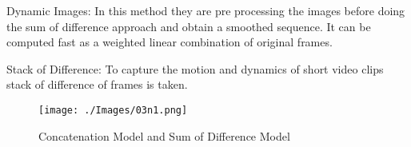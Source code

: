 Dynamic Images: In this method they are pre processing the images before doing the sum of difference approach and obtain a smoothed sequence.
It can be computed fast as a weighted linear combination of original frames.

Stack of Difference: To capture the motion and dynamics of short video clips stack of difference of frames is taken. 


\begin{figure}
\centering
\hspace{-3mm}
\texttt{[image: ./Images/03n1.png]}
\caption{Concatenation Model and Sum of Difference Model}
\label{fig:fusionmodel}
\vspace{-4mm}
\end{figure}
